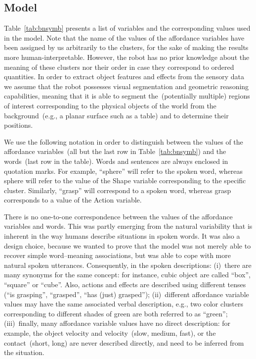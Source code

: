 \subsection{\AffWords{} Model}
Table~\ref{tab:bnsymb} presents a list of variables and the corresponding values used in the \AffWords{} model.
Note that the name of the values of the affordance variables have been assigned by us arbitrarily to the clusters, for the sake of making the results more human-interpretable.
However, the robot has no prior knowledge about the meaning of these clusters nor their order in case they correspond to ordered quantities.
In order to extract object features and effects from the sensory data we assume that the robot possesses visual segmentation and geometric reasoning capabilities, meaning that it is able to segment the~(potentially multiple) regions of interest corresponding to the physical objects of the world from the background~(e.g., a planar surface such as a table) and to determine their positions.

We use the following notation in order to distinguish between the values of the affordance variables~(all but the last row in Table~\ref{tab:bnsymb}) and the words~(last row in the table).
Words and sentences are always enclosed in quotation marks.
For example, ``sphere'' will refer to the spoken word, whereas sphere will refer to the value of the Shape variable corresponding to the specific cluster.
Similarly, ``grasp'' will correspond to a spoken word, whereas grasp corresponds to a value of the Action variable.

There is no one-to-one correspondence between the values of the affordance variables and words.
This was partly emerging from the natural variability that is inherent in the way humans describe situations in spoken words.
It was also a design choice, because we wanted to prove that the model was not merely able to recover simple word--meaning associations, but was able to cope with more natural spoken utterances.
Consequently, in the spoken descriptions:
(i)~there are many synonyms for the same concept: for instance, cubic object are called ``box'', ``square'' or ``cube''. Also, actions and effects are described using different tenses (``is grasping'', ``grasped'', ``has (just) grasped'');
(ii)~different affordance variable values may have the same associated verbal description, e.g., two color clusters corresponding to different shades of green are both referred to as ``green'';
(iii)~finally, many affordance variable values have no direct description: for example, the object velocity and \objecthand{} velocity~(slow, medium, fast), or the \objecthand{} contact~(short, long) are never described directly, and need to be inferred from the situation.


